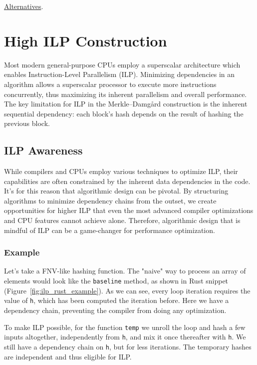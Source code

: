 \documentclass[10pt]{article}
\begin{document}
\href{https://www.researchgate.net/publication/322094216_Merkle-Damgard_Construction_Method_and_Alternatives_A_Review}{Alternatives}.

\section{High ILP Construction} \label{highilp}

Most modern general-purpose CPUs employ a superscalar architecture which enables Instruction-Level Parallelism (ILP). 
Minimizing dependencies in an algorithm allows a superscalar processor to execute more instructions concurrently,
thus maximizing its inherent parallelism and overall performance.
The key limitation for ILP in the Merkle–Damgård construction is the inherent sequential dependency:
each block's hash depends on the result of hashing the previous block.

\subsection{ILP Awareness}

While compilers and CPUs employ various techniques to optimize ILP, their capabilities are often constrained by the inherent data dependencies
in the code. It's for this reason that algorithmic design can be pivotal. By structuring algorithms to minimize dependency chains from the outset,
we create opportunities for higher ILP that even the most advanced compiler optimizations and CPU features cannot achieve alone. Therefore,
algorithmic design that is mindful of ILP can be a game-changer for performance optimization.

\subsubsection{Example}
Let's take a FNV-like hashing function. The "naive" way to process an array of elements would look like the \texttt{baseline} method,
as shown in Rust snippet (Figure~\ref{fig:ilp_rust_example}). As we can see, every loop iteration requires the value of \texttt{h},
which has been computed the iteration before. Here we have a dependency chain, preventing the compiler from doing any optimization.

To make ILP possible, for the function \texttt{temp} we unroll the loop and hash a few inputs altogether, independently from \texttt{h},
and mix it once thereafter with \texttt{h}. We still have a dependency chain on \texttt{h}, but for less iterations.
The temporary hashes are independent and thus eligible for ILP.
\end{document}
